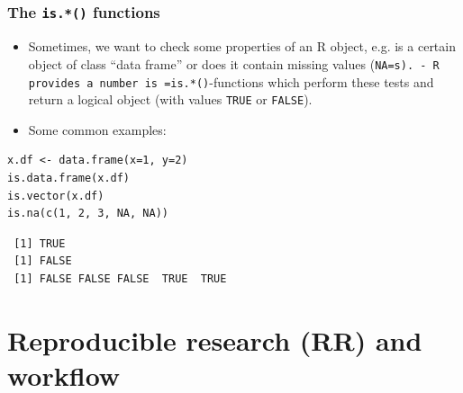 \documentclass[bigger]{beamer}
\begin{document}
\subsection{}
\begin{frame}[fragile,label=slide_is_function]
\frametitle{The \texttt{is.*()} functions}
\label{sec-6-1-1}

\begin{itemize}
\item Sometimes, we want to check some properties of an R object, e.g. is a
      certain object of class \enquote{data frame} or does it contain missing values (\texttt{NA=s).     - R provides a number is =is.*()}-functions which perform these tests and
      return a logical object (with values \texttt{TRUE} or \texttt{FALSE}).
\item Some common examples:
\end{itemize}


\lstset{language=R}
\begin{lstlisting}
x.df <- data.frame(x=1, y=2)
is.data.frame(x.df)
is.vector(x.df)
is.na(c(1, 2, 3, NA, NA))
\end{lstlisting}

\begin{verbatim}
 [1] TRUE
 [1] FALSE
 [1] FALSE FALSE FALSE  TRUE  TRUE
\end{verbatim}
\end{frame}
\section{Reproducible research (RR) and workflow}
\label{sec-7}
\end{document}
